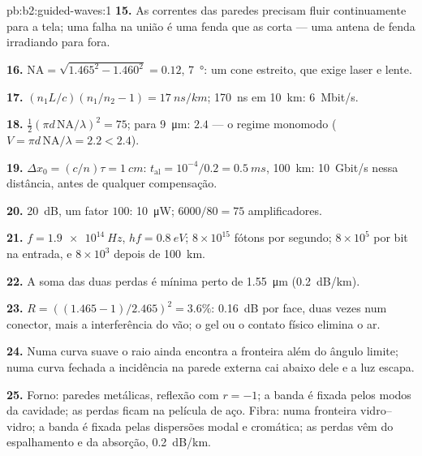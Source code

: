 \begin{solution}{pb:b2:guided-waves:1}
\textbf{15.} As correntes das paredes precisam fluir continuamente para a tela;
uma falha na união é uma fenda que as corta --- uma antena de fenda
irradiando para fora.

\textbf{16.} $\mathrm{NA} = \sqrt{1.465^2 - 1.460^2} = 0.12$, \qty{7}{\degree}: um cone
estreito, que exige laser e lente.

\textbf{17.} $(n_1L/c)(n_1/n_2 - 1) = \qty{17}{ns/km}$; \qty{170}{ns} em \qty{10}{km}:
\qty{6}{Mbit/s}.

\textbf{18.} $\tfrac12(\pi d\,\mathrm{NA}/\lambda)^2 = 75$; para \qty{9}{\micro m}: $2.4$ --- o
regime monomodo ($V = \pi d\,\mathrm{NA}/\lambda = 2.2 < 2.4$).

\textbf{19.} $\Delta x_0 = (c/n)\tau = \qty{1}{cm}$: $t_{\text{al}} = 10^{-4}/0.2 = \qty{0.5}{ms}$,
\qty{100}{km}: \qty{10}{Gbit/s} nessa distância, antes de qualquer compensação.

\textbf{20.} \qty{20}{dB}, um fator $100$: \qty{10}{\micro W}; $6000/80 = 75$
amplificadores.

\textbf{21.} $f = \qty{1.9e14}{Hz}$, $hf = \qty{0.8}{eV}$; $8 \times 10^{15}$ fótons por
segundo; $8 \times 10^5$ por bit na entrada, e $8 \times 10^3$ depois de \qty{100}{km}.

\textbf{22.} A soma das duas perdas é mínima perto de \qty{1.55}{\micro m}
(\qty{0.2}{dB/km}).

\textbf{23.} $R = ((1.465 - 1)/2.465)^2 = 3.6\%$: \qty{0.16}{dB} por face, duas vezes
num conector, mais a interferência do vão; o gel ou o contato físico
elimina o ar.

\textbf{24.} Numa curva suave o raio ainda encontra a fronteira além
do ângulo limite; numa curva fechada a incidência na parede externa
cai abaixo dele e a luz escapa.

\textbf{25.} Forno: paredes metálicas, reflexão com $r = -1$; a banda é fixada
pelos modos da cavidade; as perdas ficam na película de aço. Fibra:  numa fronteira vidro--vidro; a banda é fixada pelas dispersões modal e
cromática; as perdas vêm do espalhamento e da absorção, \qty{0.2}{dB/km}.
\end{solution}
